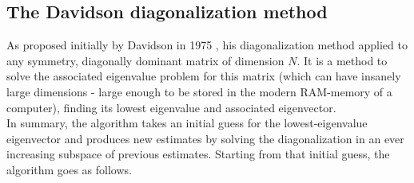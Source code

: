     \subsection{The Davidson diagonalization method}
        As proposed initially by Davidson in 1975 \cite{davidson1975}, his diagonalization method applied to any symmetry, diagonally dominant matrix of dimension $N$. It is a method to solve the associated eigenvalue problem for this matrix (which can have insanely large dimensions - large enough to be stored in the modern RAM-memory of a computer), finding its lowest eigenvalue and associated eigenvector. \\

        In summary, the algorithm takes an initial guess for the lowest-eigenvalue eigenvector and produces new estimates by solving the diagonalization in an ever increasing subspace of previous estimates. Starting from that initial guess, the algorithm goes as follows.
